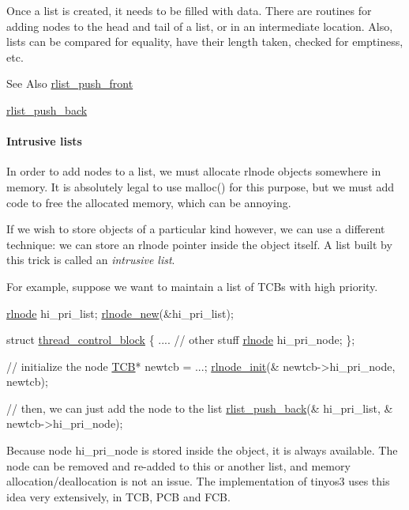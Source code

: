Once a list is created, it needs to be filled with data. There are routines for adding nodes to the head and tail of a list, or in an intermediate location. Also, lists can be compared for equality, have their length taken, checked for emptiness, etc. \begin{DoxySeeAlso}{See Also}
\hyperlink{group__rlists_ga63ab59e50f2007a6bfedb0180a73b06f}{rlist\-\_\-push\-\_\-front} 

\hyperlink{group__rlists_gac454004e8fb74ccd539e7fbd1affa86a}{rlist\-\_\-push\-\_\-back}
\end{DoxySeeAlso}
\paragraph*{Intrusive lists}

In order to add nodes to a list, we must allocate {\ttfamily rlnode} objects somewhere in memory. It is absolutely legal to use {\ttfamily malloc()} for this purpose, but we must add code to free the allocated memory, which can be annoying.

If we wish to store objects of a particular kind however, we can use a different technique\-: we can store an rlnode pointer inside the object itself. A list built by this trick is called an {\itshape intrusive list}.

For example, suppose we want to maintain a list of T\-C\-Bs with high priority. 
\begin{DoxyCode}
\hyperlink{structresource__list__node}{rlnode} hi\_pri\_list;  \hyperlink{group__rlists_gaccdb4bce65952fede472de20297eb36e}{rlnode\_new}(&hi\_pri\_list);

\textcolor{keyword}{struct }\hyperlink{structthread__control__block}{thread\_control\_block} \{
 .... \textcolor{comment}{// other stuff}
 \hyperlink{structresource__list__node}{rlnode} hi\_pri\_node;
\};

\textcolor{comment}{// initialize the node}
\hyperlink{structthread__control__block}{TCB}* newtcb = ...;
\hyperlink{group__rlists_ga578e6dc256d4f1580bd8500edf374aca}{rlnode\_init}(& newtcb->hi\_pri\_node, newtcb);

\textcolor{comment}{// then, we can just add the node to the list}
\hyperlink{group__rlists_gac454004e8fb74ccd539e7fbd1affa86a}{rlist\_push\_back}(& hi\_pri\_list, & newtcb->hi\_pri\_node);
\end{DoxyCode}


Because node {\ttfamily hi\-\_\-pri\-\_\-node} is stored inside the object, it is always available. The node can be removed and re-\/added to this or another list, and memory allocation/deallocation is not an issue. The implementation of tinyos3 uses this idea very extensively, in T\-C\-B, P\-C\-B and F\-C\-B. 

